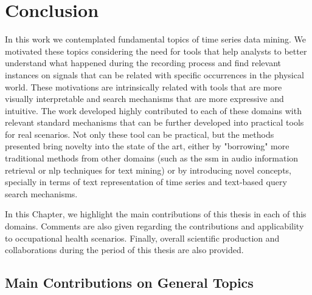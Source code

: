 
%

\chapter{Conclusion}
\label{cha:Conclusion}


In this work we contemplated fundamental topics of time series data mining. We motivated these topics considering the need for tools that help analysts to better understand what happened during the recording process and find relevant instances on signals that can be related with specific occurrences in the physical world. These motivations are intrinsically related with tools that are more visually interpretable and search mechanisms that are more expressive and intuitive. The work developed highly contributed to each of these domains with relevant standard mechanisms that can be further developed into practical tools for real scenarios. Not only these tool can be practical, but the methods presented bring novelty into the state of the art, either by "borrowing" more traditional methods from other domains (such as the \gls{ssm} in audio information retrieval or \gls{nlp} techniques for text mining) or by introducing novel concepts, specially in terms of text representation of time series and text-based query search mechanisms.
\par
In this Chapter, we highlight the main contributions of this thesis in each of this domains. Comments are also given regarding the contributions and applicability to occupational health scenarios. Finally, overall scientific production and collaborations during the period of this thesis are also provided. 

\section{Main Contributions on General Topics}

